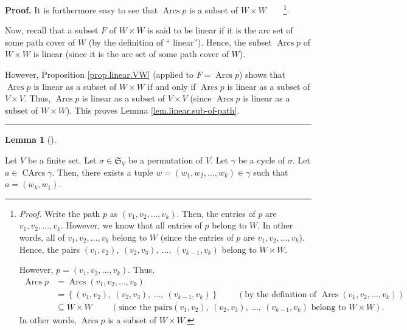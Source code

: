 \documentclass[numbers=enddot,12pt,final,onecolumn,notitlepage]{scrartcl}%
\numberwithin{exer}{section}
\theoremstyle{definition}
\newtheorem{lem}[theo]{Lemma}
\newenvironment{lemma}[1][]
{\begin{lem}[#1]\begin{leftbar}}
{\end{leftbar}\end{lem}}
\newenvironment{proof}[1][Proof]{\noindent\textbf{#1.} }{\ \rule{0.5em}{0.5em}}
\newenvironment{verlong}{}{}
\begin{document}
\begin{verlong}
\begin{proof}
It is furthermore easy to see that $\operatorname*{Arcs}p$ is a subset of
$W\times W$\ \ \ \ \footnote{\textit{Proof.} Write the path $p$ as $\left(
v_{1},v_{2},\ldots,v_{k}\right)  $. Then, the entries of $p$ are $v_{1}%
,v_{2},\ldots,v_{k}$. However, we know that all entries of $p$ belong to $W$.
In other words, all of $v_{1},v_{2},\ldots,v_{k}$ belong to $W$ (since the
entries of $p$ are $v_{1},v_{2},\ldots,v_{k}$). Hence, the pairs $\left(
v_{1},v_{2}\right)  ,\ \left(  v_{2},v_{3}\right)  ,\ \ldots,\ \left(
v_{k-1},v_{k}\right)  $ belong to $W\times W$.
\par
However, $p=\left(  v_{1},v_{2},\ldots,v_{k}\right)  $. Thus,%
\begin{align*}
\operatorname*{Arcs}p  &  =\operatorname*{Arcs}\left(  v_{1},v_{2}%
,\ldots,v_{k}\right) \\
&  =\left\{  \left(  v_{1},v_{2}\right)  ,\ \left(  v_{2},v_{3}\right)
,\ \ldots,\ \left(  v_{k-1},v_{k}\right)  \right\}
\ \ \ \ \ \ \ \ \ \ \left(  \text{by the definition of }\operatorname*{Arcs}%
\left(  v_{1},v_{2},\ldots,v_{k}\right)  \right) \\
&  \subseteq W\times W\ \ \ \ \ \ \ \ \ \ \left(  \text{since the pairs
}\left(  v_{1},v_{2}\right)  ,\ \left(  v_{2},v_{3}\right)  ,\ \ldots
,\ \left(  v_{k-1},v_{k}\right)  \text{ belong to }W\times W\right)  .
\end{align*}
In other words, $\operatorname*{Arcs}p$ is a subset of $W\times W$.}.

Now, recall that a subset $F$ of $W\times W$ is said to be linear if it is the
arc set of some path cover of $W$ (by the definition of \textquotedblleft
linear\textquotedblright). Hence, the subset $\operatorname*{Arcs}p$ of
$W\times W$ is linear (since it is the arc set of some path cover of $W$).

However, Proposition \ref{prop.linear.VW} (applied to $F=\operatorname*{Arcs}%
p$) shows that $\operatorname*{Arcs}p$ is linear as a subset of $W\times W$ if
and only if $\operatorname*{Arcs}p$ is linear as a subset of $V\times V$.
Thus, $\operatorname*{Arcs}p$ is linear as a subset of $V\times V$ (since
$\operatorname*{Arcs}p$ is linear as a subset of $W\times W$). This proves
Lemma \ref{lem.linear.sub-of-path}.
\end{proof}

\begin{lemma}
\label{lem.cycle.rotate}Let $V$ be a finite set. Let $\sigma\in\mathfrak{S}%
_{V}$ be a permutation of $V$. Let $\gamma$ be a cycle of $\sigma$. Let
$a\in\operatorname*{CArcs}\gamma$. Then, there exists a tuple $w=\left(
w_{1},w_{2},\ldots,w_{k}\right)  \in\gamma$ such that $a=\left(  w_{k}%
,w_{1}\right)  $.
\end{lemma}


\end{verlong}
\end{document}
